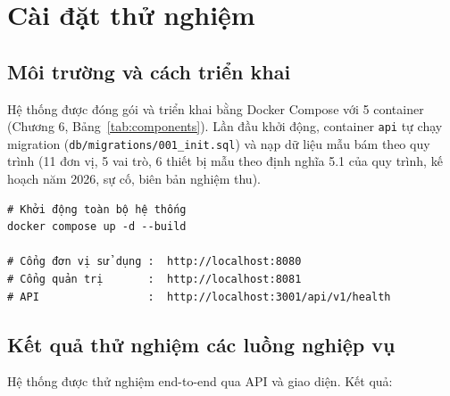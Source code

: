 \chapter{Cài đặt thử nghiệm}

\section{Môi trường và cách triển khai}

Hệ thống được đóng gói và triển khai bằng Docker Compose với 5 container (Chương 6, Bảng~\ref{tab:components}). Lần đầu khởi động, container \texttt{api} tự chạy migration (\texttt{db/migrations/001\_init.sql}) và nạp dữ liệu mẫu bám theo quy trình (11 đơn vị, 5 vai trò, 6 thiết bị mẫu theo định nghĩa 5.1 của quy trình, kế hoạch năm 2026, sự cố, biên bản nghiệm thu).

\begin{verbatim}
# Khởi động toàn bộ hệ thống
docker compose up -d --build

# Cổng đơn vị sử dụng :  http://localhost:8080
# Cổng quản trị       :  http://localhost:8081
# API                 :  http://localhost:3001/api/v1/health
\end{verbatim}

\section{Kết quả thử nghiệm các luồng nghiệp vụ}

Hệ thống được thử nghiệm end-to-end qua API và giao diện. Kết quả:

